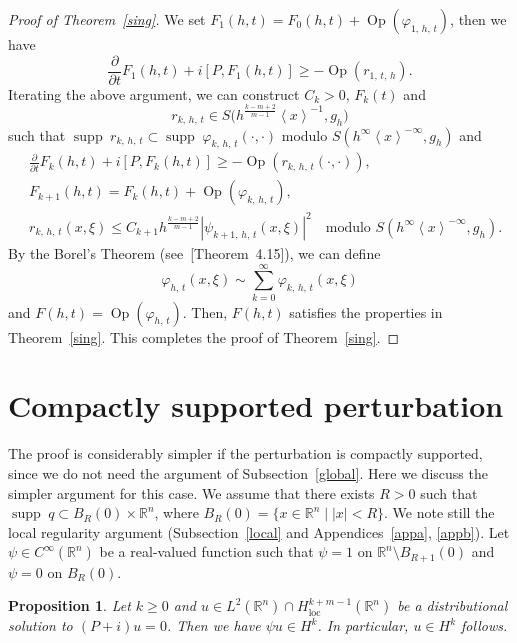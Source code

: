 \documentclass[10pt]{amsart}
\newtheorem{prop}[cdrthm]{Proposition}
\theoremstyle{definition}
\newcommand*\f{\varphi}
\newcommand*\g{\psi}
\newcommand*\x{\xi}
\DeclareMathOperator{\Op}{Op}
\newcommand*\re{\mathbb{R}}
\newcommand*\pa{\partial}
\DeclareMathOperator{\supp}{supp\;}
\DeclareMathOperator{\loc}{loc}
\newcommand{\jap}[1]{\left\langle #1 \right\rangle}
\newcommand{\bigpare}[1]{\bigl(#1\bigr)}
\begin{document}
\begin{proof}[Proof of Theorem~\ref{sing}]
We set $F_1(h,t) = F_0(h,t) +\Op(\f_{1,\,h,\,t})$, then we have
\[
\frac{\pa}{\pa t} F_1(h,t) + i[P,F_1(h,t)] \geq - \Op(r_{1,\,t,\,h}).
\]
Iterating the above argument, we can construct $C_k>0$, $F_k(t)$ and
\[
r_{k,\,h,\,t} \in S\bigpare{h^{\frac{k-m+2}{m-1}}\jap{x}^{-1},g_h}
\]
such that $\supp r_{k,\,h,\,t}\subset \supp \f_{k,\,h,\,t}(\cdot,\cdot)$ modulo $S(h^{\infty}\jap{x}^{-\infty},g_h)$ and
\begin{align*}
&\frac{\pa}{\pa t} F_k(h,t) + i[P,F_k(h,t)] \geq -\Op(r_{k,\,h,\,t}(\cdot,\cdot)),\\
&F_{k+1}(h,t) = F_{k}(h,t) + \Op(\f_{k,\,h,\,t}),\\
&r_{k,\,h,\,t}(x,\x) \leq C_{k+1}h^{\frac{k-m+2}{m-1}} |\g_{k+1,\,h,\,t}(x,\x)|^2\quad\text{modulo } S(h^{\infty}\jap{x}^{-\infty},g_h).
\end{align*}
By the Borel's Theorem (see~[Theorem~4.15]\cite{Z}), we can define
\[
\f_{h,\,t}(x,\x) \sim \sum_{k=0}^{\infty} \f_{k,\,h,\,t}(x,\x)
\]
and $F(h,t) = \Op(\f_{h,\,t})$. Then, $F(h,t)$ satisfies the properties in Theorem~\ref{sing}. This completes the proof of Theorem~\ref{sing}.
\end{proof}


\section{Compactly supported perturbation}\label{appcpt}

The proof is considerably simpler if the perturbation is compactly supported, since we do not need the argument of Subsection~\ref{global}. Here we discuss the simpler argument for this case. We assume that there exists $R>0$ such that $\supp q\subset B_R(0)\times \re^n$, where $B_R(0)=\{x\in \re^n\mid |x|<R\}$. We note still the local regularity argument (Subsection~\ref{local} and Appendices~\ref{appa}, \ref{appb}). Let $\g\in C^{\infty}(\re^n)$ be a real-valued function such that $\g=1$ on $\re^n\setminus B_{R+1}(0)$ and $\g=0$ on $B_R(0)$.

\begin{prop}\label{cptsupp}
Let $k\geq 0$ and $u\in L^2(\re^n) \cap H^{k+m-1}_{\loc}(\re^n)$ be a distributional solution to $(P +i) u = 0$. Then we have $\g u \in H^k$. In particular, $u\in H^k$ follows.
\end{prop}
\end{document}
